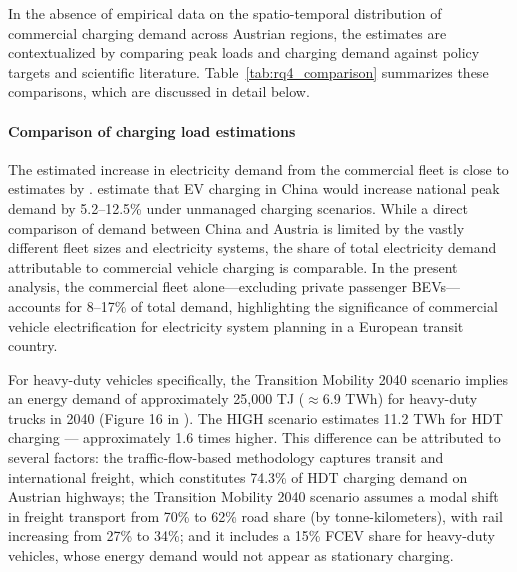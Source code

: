 In the absence of empirical data on the spatio-temporal distribution of commercial charging demand across Austrian regions, the estimates are contextualized by comparing peak loads and charging demand against policy targets and scientific literature. Table~\ref{tab:rq4_comparison} summarizes these comparisons, which are discussed in detail below.

\paragraph*{Comparison of charging load estimations} The estimated increase in electricity demand from the commercial fleet is close to estimates by \citet{LI2021111962}. \citet{LI2021111962} estimate that EV charging in China would increase national peak demand by 5.2--12.5\% under unmanaged charging scenarios. While a direct comparison of demand between China and Austria is limited by the vastly different fleet sizes and electricity systems, the share of total electricity demand attributable to commercial vehicle charging is comparable. In the present analysis, the commercial fleet alone---excluding private passenger \acp{BEV}---accounts for 8--17\% of total demand, highlighting the significance of commercial vehicle electrification for electricity system planning in a European transit country.

For heavy-duty vehicles specifically, the Transition Mobility 2040 scenario implies an energy demand of approximately 25,000 TJ ($\approx$6.9 TWh) for heavy-duty trucks in 2040 (Figure 16 in \cite{umweltbundesamt_rep0808}). The HIGH scenario estimates 11.2 TWh for \ac{HDT} charging — approximately 1.6 times higher. This difference can be attributed to several factors: the traffic-flow-based methodology captures transit and international freight, which constitutes 74.3\% of \ac{HDT} charging demand on Austrian highways; the Transition Mobility 2040 scenario assumes a modal shift in freight transport from 70\% to 62\% road share (by tonne-kilometers), with rail increasing from 27\% to 34\%; and it includes a 15\% FCEV share for heavy-duty vehicles, whose energy demand would not appear as stationary charging.

